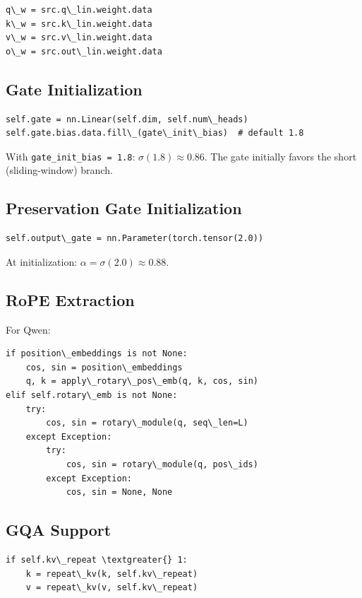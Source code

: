 \begin{lstlisting}
q\_w = src.q\_lin.weight.data
k\_w = src.k\_lin.weight.data
v\_w = src.v\_lin.weight.data
o\_w = src.out\_lin.weight.data
\end{lstlisting}

\subsection{Gate Initialization}

\begin{lstlisting}
self.gate = nn.Linear(self.dim, self.num\_heads)
self.gate.bias.data.fill\_(gate\_init\_bias)  # default 1.8
\end{lstlisting}

With \texttt{gate\_init\_bias = 1.8}: $\sigma(1.8) \approx 0.86$. The gate initially 
favors the short (sliding-window) branch.

\subsection{Preservation Gate Initialization}

\begin{lstlisting}
self.output\_gate = nn.Parameter(torch.tensor(2.0))
\end{lstlisting}

At initialization: $\alpha = \sigma(2.0) \approx 0.88$.

\subsection{RoPE Extraction}

For Qwen:

\begin{lstlisting}
if position\_embeddings is not None:
    cos, sin = position\_embeddings
    q, k = apply\_rotary\_pos\_emb(q, k, cos, sin)
elif self.rotary\_emb is not None:
    try:
        cos, sin = rotary\_module(q, seq\_len=L)
    except Exception:
        try:
            cos, sin = rotary\_module(q, pos\_ids)
        except Exception:
            cos, sin = None, None
\end{lstlisting}

\subsection{GQA Support}

\begin{lstlisting}
if self.kv\_repeat \textgreater{} 1:
    k = repeat\_kv(k, self.kv\_repeat)
    v = repeat\_kv(v, self.kv\_repeat)
\end{lstlisting}

